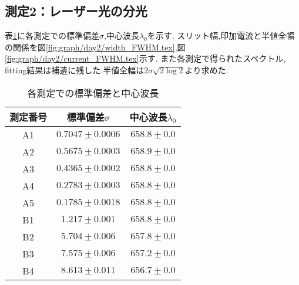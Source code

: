 \subsection{測定2：レーザー光の分光}
表\ref{tab:sigma_center}に各測定での標準偏差$\sigma$,中心波長$\lambda_0$を示す.
スリット幅,印加電流と半値全幅の関係を図\ref{fig:graph/day2/width_FWHM.tex},図\ref{fig:graph/day2/current_FWHM.tex}示す.
また各測定で得られたスペクトル, fitting結果は補遺に残した.半値全幅は$2\sigma\sqrt{2\log2}$より求めた.
\begin{table}[h]
\caption{各測定での標準偏差と中心波長}
\label{tab:sigma_center}
\centering
\begin{tabular}{c|cc}
\hline
測定番号&標準偏差$\sigma$&中心波長$\lambda_0$\\
\hline \hline
A1&$0.7047\pm0.0006$& $658.8\pm0.0$\\
A2&$0.5675\pm0.0003$& $658.9\pm0.0$\\
A3&$0.4365\pm0.0002$& $658.8\pm0.0$\\
A4&$0.2783\pm0.0003$& $658.8\pm0.0$\\
A5&$0.1785\pm0.0018$& $658.8\pm0.0$\\
B1&$1.217\pm0.001$& $658.8\pm0.0$\\
B2&$5.704\pm0.006$& $657.8\pm0.0$\\
B3&$7.575\pm0.006$& $657.2\pm0.0$\\
B4&$8.613\pm0.011$& $656.7\pm0.0$\\
\hline
\end{tabular}
\end{table}
